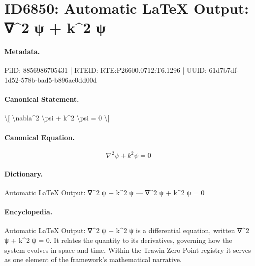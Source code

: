 \section*{ID6850: Automatic LaTeX Output: ∇\textasciicircum{}2 ψ + k\textasciicircum{}2 ψ}
\paragraph{Metadata.}
PiID: 8856986705431 | RTEID: RTE:P26600.0712:T6.1296 | UUID: 61d7b7df-1d52-578b-bad5-b896ae0dd00d

\paragraph{Canonical Statement.}
\textbackslash{}[ \textbackslash{}nabla\textasciicircum{}2 \textbackslash{}psi + k\textasciicircum{}2 \textbackslash{}psi = 0 \textbackslash{}]

\paragraph{Canonical Equation.}
\[
\nabla^2 \psi + k^2 \psi = 0
\]

\paragraph{Dictionary.}
Automatic LaTeX Output: ∇\textasciicircum{}2 ψ + k\textasciicircum{}2 ψ — ∇\textasciicircum{}2 ψ + k\textasciicircum{}2 ψ = 0

\paragraph{Encyclopedia.}
Automatic LaTeX Output: ∇\textasciicircum{}2 ψ + k\textasciicircum{}2 ψ is a differential equation, written ∇\textasciicircum{}2 ψ + k\textasciicircum{}2 ψ = 0. It relates the quantity to its derivatives, governing how the system evolves in space and time. Within the Trawin Zero Point registry it serves as one element of the framework's mathematical narrative.
